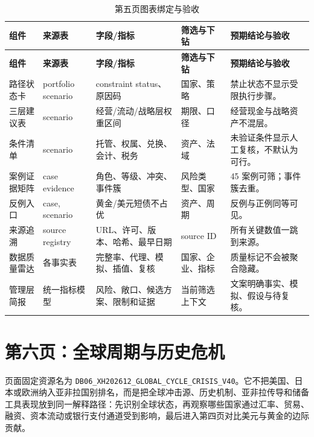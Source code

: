 \documentclass[UTF8,fontset=windows,12pt,openany]{ctexbook}
\newcommand{\Field}[1]{{\small\nolinkurl{#1}}}
\begin{document}
\clearpage
\begin{landscape}
\begin{longtable}{p{3.3cm}p{3.6cm}p{4.4cm}p{3.1cm}p{4.5cm}}
\caption{第五页图表绑定与验收}\label{tab:page5-map}\\
\toprule
\textbf{组件} & \textbf{来源表} & \textbf{字段/指标} & \textbf{筛选与下钻} & \textbf{预期结论与验收}\\
\midrule
\endfirsthead
\toprule \textbf{组件} & \textbf{来源表} & \textbf{字段/指标} & \textbf{筛选与下钻} & \textbf{预期结论与验收}\\ \midrule
\endhead
路径状态卡 & portfolio scenario & constraint status、原因码 & 国家、策略 & 禁止状态不显示受限执行步骤。\\
三层建议表 & scenario & 经营/流动/战略层权重区间 & 期限、口径 & 经营现金与战略资产不混层。\\
条件清单 & scenario & 托管、权属、兑换、会计、税务 & 资产、法域 & 未验证条件显示人工复核，不默认为可行。\\
案例证据矩阵 & case evidence & 角色、等级、冲突、事件簇 & 风险类型、国家 & 45 案例可筛；事件簇去重。\\
反例入口 & case, scenario & 黄金/美元短债不占优 & 资产、周期 & 反例与正例同等可见。\\
来源追溯 & source registry & URL、许可、版本、哈希、最早日期 & source ID & 所有关键数值一跳到来源。\\
数据质量雷达 & 各事实表 & 完整率、代理、模拟、插值、复核 & 国家、企业、指标 & 质量标记不会被聚合隐藏。\\
管理层简报 & 统一指标模型 & 风险、敞口、候选方案、限制和证据 & 当前筛选上下文 & 文案明确事实、模拟、假设与待复核。\\
\bottomrule
\end{longtable}
\end{landscape}

\chapter{第六页：全球周期与历史危机}

页面固定资源名为 \Field{DB06_XH202612_GLOBAL_CYCLE_CRISIS_V40}。它不把美国、日本或欧洲纳入亚非拉国别排名，而是把全球冲击源、历史机制、亚非拉传导和储备工具表现放到同一解释路径：先识别全球状态，再观察哪些国家通过汇率、贸易、融资、资本流动或银行支付通道受到影响，最后进入第四页对比美元与黄金的边际贡献。
\end{document}
